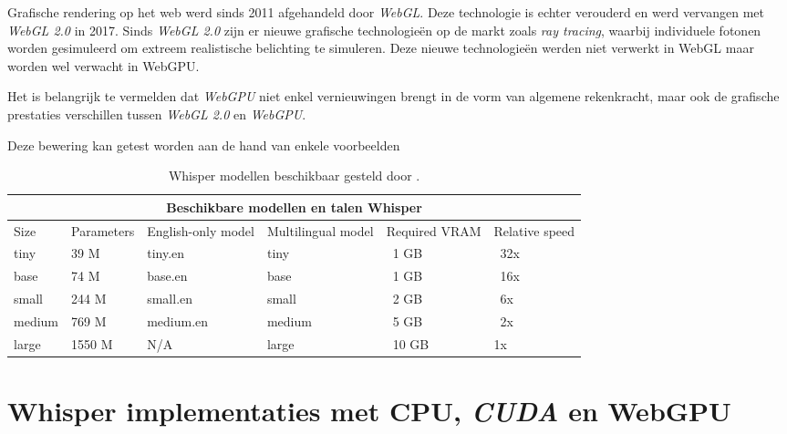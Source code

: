 Grafische rendering op het web werd sinds 2011 afgehandeld door \textit{WebGL}. Deze technologie is echter verouderd en werd vervangen met \textit{WebGL 2.0} in 2017. Sinds \textit{WebGL 2.0} zijn er nieuwe grafische technologieën op de markt zoals \textit{ray tracing}, waarbij individuele fotonen worden gesimuleerd om extreem realistische belichting te simuleren. Deze nieuwe technologieën werden niet verwerkt in WebGL maar worden wel verwacht in WebGPU.

\bigbreak{}

Het is belangrijk te vermelden dat \textit{WebGPU} niet enkel vernieuwingen brengt in de vorm van algemene rekenkracht, maar ook de grafische prestaties verschillen tussen \textit{WebGL 2.0} en \textit{WebGPU}. 

\bigbreak{}

Deze bewering kan getest worden aan de hand van enkele voorbeelden

\break{}

\begin{table}
    \begin{tabular}{ |p{1.5cm}|p{2.5cm}|p{3cm}|p{3cm}|p{2cm}|p{2cm}|  }
        \hline
        \multicolumn{6}{|c|}{Beschikbare modellen en talen Whisper} \\
        \hline
            Size& Parameters & English-only model & Multilingual model & Required VRAM & Relative speed\\
        \hline
            tiny&       39 M    &tiny.en    & tiny& ~1 GB& ~32x     \\
            base &      74 M	&base.en    & base & ~1 GB & ~16x   \\
            small &     244 M	&small.en   & small & ~2 GB & ~6x   \\
            medium &    769 M	&medium.en  & medium & ~5 GB & ~2x  \\
            large &     1550 M	&N/A        & large & ~10 GB& 	1x  \\
        \hline
    \end{tabular}
    \caption{Whisper modellen beschikbaar gesteld door \textcite{OpenAI2023}.}
    \label{tab:OpenAIWhisperModels}
\end{table}

\section{Whisper implementaties met CPU, \textit{CUDA} en WebGPU}%
\label{sec:whispertest}

